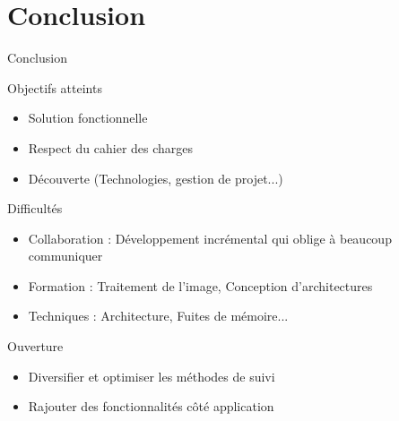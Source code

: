 \documentclass{beamer}
\begin{document}
      \section{Conclusion}
            \begin{frame}{Conclusion}
                  \begin{exampleblock}{Objectifs atteints}
					\begin{itemize}
                        \item Solution fonctionnelle \\
                        \item Respect du cahier des charges \\
                        \item Découverte (Technologies, gestion de projet...) \\ 
					\end{itemize}
                  \end{exampleblock}
                  \pause
                  \begin{alertblock}{Difficultés}
					\begin{itemize}
                        \item Collaboration : Développement incrémental qui oblige à beaucoup communiquer \\
                        \item Formation : Traitement de l'image, Conception d'architectures \\
                        \item Techniques : Architecture, Fuites de mémoire...\\
					\end{itemize}
                  \end{alertblock}
                  \pause
                  \begin{block}{Ouverture}
					\begin{itemize}
                        \item Diversifier et optimiser les méthodes de suivi \\
                        \item Rajouter des fonctionnalités côté application \\
					\end{itemize}
                  \end{block}
            \end{frame}
      
\end{document}
